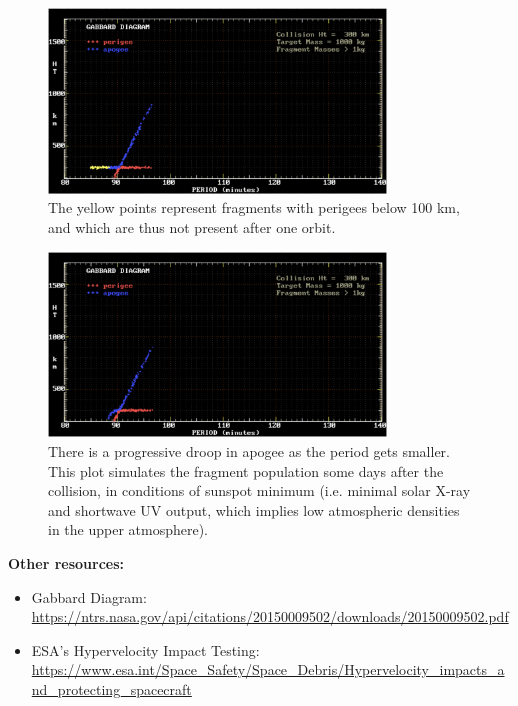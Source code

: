 \documentclass[12pt]{report}
\begin{document}
\begin{itemize}
  \begin{figure}[H]
    \centering
    \includegraphics[width=0.8\textwidth]{figure_week_6_gabbard-diagram-decay1-au.png}
    \caption{The yellow points represent fragments with perigees below 100 km, and which are thus not present after one orbit.}
    \label{fig:gabbard-diagram-decay1-au}
  \end{figure}

  \begin{figure}[H]
    \centering
    \includegraphics[width=0.8\textwidth]{figure_week_6_gabbard-diagram-decay2-au.png}
    \caption{There is a progressive droop in apogee as the period gets smaller. This plot simulates the fragment population some days after the collision, in conditions of sunspot minimum (i.e. minimal solar X-ray and shortwave UV output, which implies low atmospheric densities in the upper atmosphere).}
    \label{fig:gabbard-diagram-decay2-au}
  \end{figure}

\end{itemize}

\noindent \textbf{Other resources:}
\begin{itemize}
  \item Gabbard Diagram: \url{https://ntrs.nasa.gov/api/citations/20150009502/downloads/20150009502.pdf}
  \item ESA's Hypervelocity Impact Testing: \url{https://www.esa.int/Space_Safety/Space_Debris/Hypervelocity_impacts_and_protecting_spacecraft}
\end{itemize}
\end{document}
